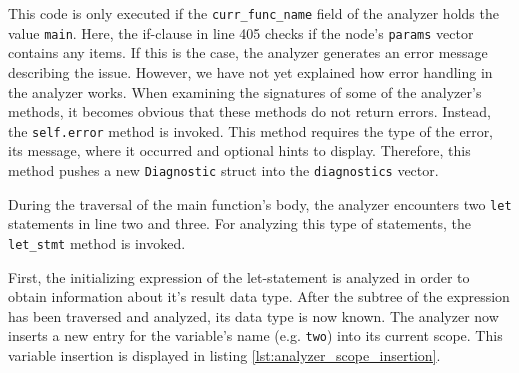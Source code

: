 
This code is only executed if the \texttt{curr\_func\_name} field of the analyzer holds the value \texttt{main}.
Here, the if-clause in line 405 checks if the node's \texttt{params} vector contains any items.
If this is the case, the analyzer generates an error message describing the issue.
However, we have not yet explained how error handling in the analyzer works.
When examining the signatures of some of the analyzer's methods, it becomes obvious that these methods do not return errors.
Instead, the \texttt{self.error} method is invoked.
This method requires the type of the error, its message, where it occurred and optional hints to display.
Therefore, this method pushes a new \texttt{Diagnostic} struct into the \texttt{diagnostics} vector.

During the traversal of the main function's body, the analyzer encounters two \texttt{let} statements in line two and three.
For analyzing this type of statements, the \texttt{let\_stmt} method is invoked.


First, the initializing expression of the let-statement is analyzed in order to obtain information about it's result data type.
After the subtree of the expression has been traversed and analyzed, its data type is now known.
The analyzer now inserts a new entry for the variable's name (e.g. \texttt{two}) into its current scope.
This variable insertion is displayed in listing \ref{lst:analyzer_scope_insertion}.


